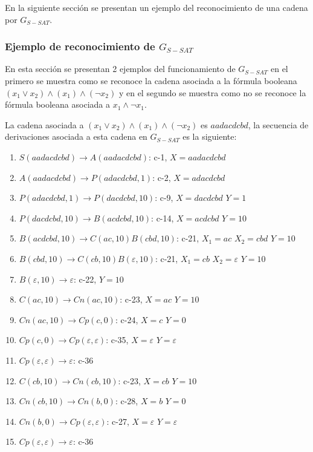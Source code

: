 En la siguiente sección se presentan un ejemplo del reconocimiento de una cadena por $G_{S-SAT}$.

\subsubsection{Ejemplo de reconocimiento de $G_{S-SAT}$}

En esta sección se presentan 2 ejemplos del funcionamiento de $G_{S-SAT}$ en el primero se muestra como se
reconoce la cadena asociada a la fórmula booleana $(x_1 \vee x_2) \wedge (x_1) \wedge (\neg x_2)$ y en el
segundo se muestra como no se reconoce la fórmula booleana asociada a $x_1 \wedge \neg x_1$.

La cadena asociada a $(x_1 \vee x_2) \wedge (x_1) \wedge (\neg x_2)$ es $aadacdcbd$, la secuencia de derivaciones
asociada a esta cadena en $G_{S-SAT}$ es la siguiente:

\begin{enumerate}
    \item $S(aadacdcbd)\to A(aadacdcbd)$: c-1, $X=aadacdcbd$
    \item $A(aadacdcbd)\to P(adacdcbd,1)$: c-2, $X=adacdcbd$
    \item $P(adacdcbd,1)\to P(dacdcbd,10)$: c-9, $X=dacdcbd$ $Y=1$
    \item $P(dacdcbd,10)\to B(acdcbd, 10)$: c-14, $X=acdcbd$ $Y=10$
    \item $B(acdcbd, 10)\to C(ac,10) B(cbd,10)$: c-21, $X_1=ac$ $X_2=cbd$ $Y=10$
    \item $B(cbd,10)\to C(cb,10) B(\varepsilon,10)$: c-21, $X_1=cb$ $X_2=\varepsilon$ $Y=10$
    \item $B(\varepsilon,10)\to \varepsilon$: c-22, $Y=10$
    \item $C(ac,10)\to Cn(ac,10)$: c-23, $X=ac$ $Y=10$
    \item $Cn(ac,10)\to Cp(c,0)$: c-24, $X=c$ $Y=0$
    \item $Cp(c,0)\to Cp(\varepsilon,\varepsilon)$: c-35, $X=\varepsilon$ $Y=\varepsilon$
    \item $Cp(\varepsilon, \varepsilon) \to \varepsilon$: c-36
    \item $C(cb,10)\to Cn(cb,10)$: c-23, $X=cb$ $Y=10$
    \item $Cn(cb,10)\to Cn(b,0)$: c-28, $X=b$ $Y=0$
    \item $Cn(b,0)\to Cp(\varepsilon,\varepsilon)$: c-27, $X=\varepsilon$ $Y=\varepsilon$
    \item $Cp(\varepsilon, \varepsilon) \to \varepsilon$: c-36
\end{enumerate}

